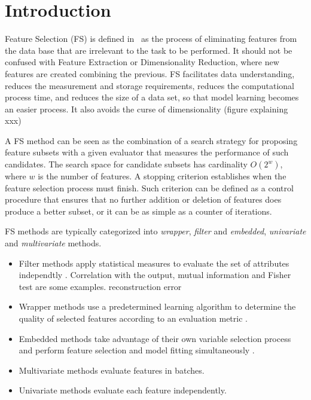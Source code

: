 \documentclass[journal,twoside,web]{ieeecolor}
\begin{document}
\section{Introduction}
\label{sec:introduction}

Feature Selection (FS) is defined in~\cite{Liu:1998:FSK:551944} as the process of eliminating features from the data base that are irrelevant to the task to be performed. It should not be confused with Feature Extraction or Dimensionality Reduction, where new features are created combining the previous.
FS facilitates data understanding, reduces the measurement and storage requirements, reduces the computational process time, and reduces the size of a data set,  so that model learning becomes an easier process. It also avoids the curse of dimensionality (figure explaining xxx) 

A FS method can be seen as the combination of a search strategy for proposing feature subsets with a given evaluator that measures the performance of such candidates. The search space for candidate subsets has cardinality $O(2^w)$, where $w$ is the number of features. A stopping criterion establishes when the feature selection process must finish. Such criterion can be defined as a control procedure that ensures that no further addition or deletion of features does produce a better subset, or it can be as simple as a counter of iterations. 

FS methods are typically categorized into \textit{wrapper\textit{}}, \textit{filter} and \textit{embedded}, \textit{univariate} and \textit{multivariate} methods. 
\begin{itemize}

\item Filter methods apply statistical measures to evaluate the set of attributes independtly \cite{Kar10, Hal98, Ami05}. Correlation with the output, mutual information and Fisher test are some examples. %
reconstruction error
\item Wrapper methods \cite{kohavi1997wrappers} use a predetermined learning algorithm to determine the quality of selected features according to an evaluation metric \cite{Japkowicz:2011:ELA:1964882}.
\item Embedded methods take advantage of their own variable selection process and perform feature selection and model fitting simultaneously \cite{Sal94}.
\item  Multivariate methods evaluate features in batches.
\item  Univariate methods evaluate each feature independently.
\end{itemize}
\end{document}
